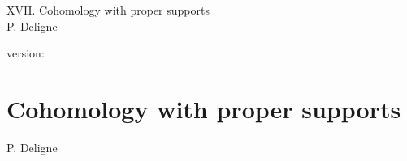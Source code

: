 \documentclass[10pt]{../fichiers-configuration-latex/smfart}
\begin{document}
\begin{center}
XVII. Cohomology with proper supports\\
P. Deligne
\end{center}

version: \showgitstatus
\tableofcontents
\mainmatter

\else
\chapter{Cohomology with proper supports}\label{sga4.exp.XVII}
\begin{center}
P. Deligne
\end{center}
\fi

\renewcommand{\sisi}[2]{#2}


























\end{document}
